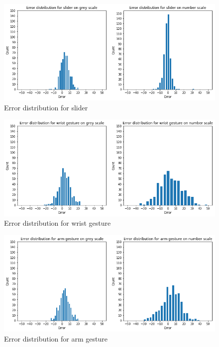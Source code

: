 \begin{figure}[h!]
    \centering
    \includegraphics[width=1\textwidth]{figures/error_dist1.png}
    \caption{Error distribution for slider}
    \label{error_dist1}
\end{figure}

\begin{figure}[h!]
    \centering
    \includegraphics[width=1\textwidth]{figures/error_dist2.png}
    \caption{Error distribution for wrist gesture}
    \label{error_dist2}
\end{figure}

\begin{figure}[h!]
    \centering
    \includegraphics[width=1\textwidth]{figures/error_dist3.png}
    \caption{Error distribution for arm gesture}
    \label{error_dist3}
\end{figure}

